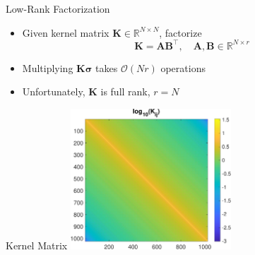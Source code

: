 \documentclass[aspectratio=169]{beamer}
\renewcommand{\Vec}[1]{\bm{#1}}
\newcommand{\Mat}[1]{\mathbf{#1}}
\newcommand{\Ord}{\mathcal{O}}
\newcommand{\RR}{\mathbb{R}}
\begin{document}
\begin{frame}{Low-Rank Factorization}
  \begin{itemize}
    \item
      Given kernel matrix $\Mat{K} \in \RR^{N \times N}$, factorize
      \begin{equation*}
        \Mat{K} = \Mat{A} \Mat{B}^\top, \quad \Mat{A}, \Mat{B} \in \RR^{N \times
        r}
      \end{equation*}
    \item
      Multiplying $\Mat{K} \Vec{\sigma}$ takes $\Ord(N r)$ operations
    \item
      Unfortunately, $\Mat{K}$ is full rank, $r = N$
  \end{itemize}
\end{frame}

\begin{frame}{Kernel Matrix}
  \centering
  \includegraphics[width=0.45\textwidth]{../figures/kernel_magnitude.pdf}
\end{frame}
\end{document}
